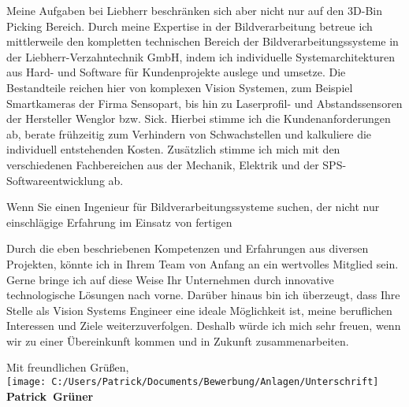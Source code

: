 \documentclass[10pt,a4paper]{article}
\def\firstname{Patrick}
\def\familyname{Grüner}
\begin{document}
Meine Aufgaben bei Liebherr beschränken sich aber nicht nur auf den 3D-Bin Picking Bereich. Durch meine Expertise in der Bildverarbeitung  betreue ich mittlerweile den kompletten technischen Bereich der Bildverarbeitungssysteme in der Liebherr-Verzahntechnik GmbH, indem ich individuelle Systemarchitekturen aus Hard- und Software für Kundenprojekte auslege und umsetze. Die Bestandteile reichen hier von komplexen Vision Systemen, zum Beispiel Smartkameras der Firma Sensopart, bis hin zu Laserprofil- und Abstandssensoren der Hersteller Wenglor bzw. Sick. Hierbei stimme ich die Kundenanforderungen ab, berate frühzeitig zum Verhindern von Schwachstellen und kalkuliere die individuell entstehenden Kosten. Zusätzlich stimme ich mich mit den verschiedenen Fachbereichen aus der Mechanik, Elektrik und der SPS-Softwareentwicklung ab.

Wenn Sie einen Ingenieur für Bildverarbeitungssysteme suchen, der nicht nur einschlägige Erfahrung im Einsatz von fertigen 

Durch die eben beschriebenen Kompetenzen und Erfahrungen aus diversen Projekten, könnte ich in Ihrem Team von Anfang an ein wertvolles Mitglied sein. Gerne bringe ich auf diese Weise Ihr Unternehmen durch innovative technologische Lösungen nach vorne. Darüber hinaus bin ich überzeugt, dass Ihre Stelle als Vision Systems Engineer eine ideale Möglichkeit ist, meine beruflichen Interessen und Ziele weiterzuverfolgen. Deshalb würde ich mich sehr freuen, wenn wir zu einer Übereinkunft kommen und in Zukunft zusammenarbeiten.


Mit freundlichen Grüßen,\\[3em]

\texttt{[image: C:/Users/Patrick/Documents/Bewerbung/Anlagen/Unterschrift]}\\
{\bfseries \firstname~\familyname}\\
%
\vfill%
\end{document}
